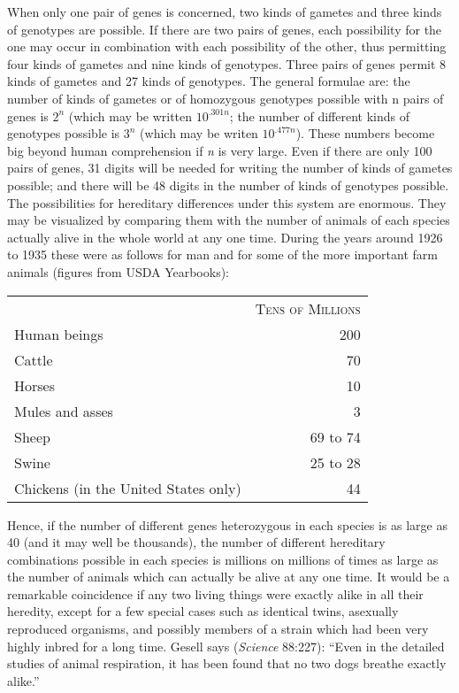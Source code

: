 When only one pair of genes is concerned, two kinds of gametes and
three kinds of genotypes are possible. If there are two pairs of genes,
each possibility for the one may occur in combination with each possibility
of the other, thus permitting four kinds of gametes and nine
kinds of genotypes. Three pairs of genes permit 8 kinds of gametes and
27 kinds of genotypes. The general formulae are: the number of kinds
of gametes or of homozygous genotypes possible with n pairs of genes is
$2^n$ (which may be written $10^{.301n}$; the number of different kinds of
genotypes possible is $3^n$ (which may be writen $10^{.477n}$). These numbers
become big beyond human comprehension if \textit{n} is very large. Even if
there are only 100 pairs of genes, 31 digits will be needed for writing
the number of kinds of gametes possible; and there will be 48 digits in
the number of kinds of genotypes possible. The possibilities for hereditary
differences under this system are enormous. They may be visualized
by comparing them with the number of animals of each species
actually alive in the whole world at any one time. During the years
around 1926 to 1935 these were as follows for man and for some of the
more important farm animals (figures from USDA Yearbooks):

\begin{table}[htbp]
	\centering
	\begin{tabular}{lr}
 						& \textsc{Tens of Millions} \\
		Human beings	& 200 \\
		Cattle			& 70 \\
		Horses			& 10 \\
		Mules and asses	& 3 \\
		Sheep			& 69 to 74 \\
		Swine			& 25 to 28 \\
		Chickens (in the United States only)	& 44 \\
	\end{tabular}
\end{table}

Hence, if the number of different genes heterozygous in each species
is as large as 40 (and it may well be thousands), the number of different
hereditary combinations possible in each species is millions on millions
of times as large as the number of animals which can actually be alive
at any one time. It would be a remarkable coincidence if any two living
things were exactly alike in all their heredity, except for a few special
cases such as identical twins, asexually reproduced organisms, and possibly
members of a strain which had been very highly inbred for a long
time. Gesell says (\textit{Science} 88:227): ``Even in the detailed studies of animal
respiration, it has been found that no two dogs breathe exactly
alike.''

